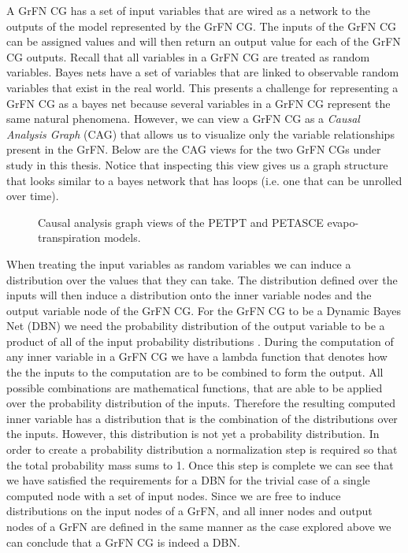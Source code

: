 A GrFN CG has a set of input variables that are wired as a network to the outputs of the model represented by the GrFN CG.
The inputs of the GrFN CG can be assigned values and will then return an output value for each of the GrFN CG outputs.
Recall that all variables in a GrFN CG are treated as random variables.
Bayes nets have a set of variables that are linked to observable random variables that exist in the real world.
This presents a challenge for representing a GrFN CG as a bayes net because several variables in a GrFN CG represent the same natural phenomena.
However, we can view a GrFN CG as a \emph{Causal Analysis Graph} (CAG) that allows us to visualize only the variable relationships present in the GrFN.
Below are the CAG views for the two GrFN CGs under study in this thesis. Notice that inspecting this view gives us a graph structure that looks similar to a bayes network that has loops (i.e. one that can be unrolled over time).

\FloatBarrier
\begin{figure}[!tbp]
  \centering

  \caption[GrFN Causal Analysis Graph Examples]{Causal analysis graph views of the PETPT and PETASCE evapo-transpiration models.}
\end{figure}
\FloatBarrier

When treating the input variables as random variables we can induce a distribution over the values that they can take.
The distribution defined over the inputs will then induce a distribution onto the inner variable nodes and the output variable node of the GrFN CG.
For the GrFN CG to be a Dynamic Bayes Net (DBN) we need the probability distribution of the output variable to be a product of all of the input probability distributions \citep{pearl2009causality}.
During the computation of any inner variable in a GrFN CG we have a lambda function that denotes how the the inputs to the computation are to be combined to form the output.
All possible combinations are mathematical functions, that are able to be applied over the probability distribution of the inputs.
Therefore the resulting computed inner variable has a distribution that is the combination of the distributions over the inputs.
However, this distribution is not yet a probability distribution.
In order to create a probability distribution a normalization step is required so that the total probability mass sums to 1.
Once this step is complete we can see that we have satisfied the requirements for a DBN for the trivial case of a single computed node with a set of input nodes.
Since we are free to induce distributions on the input nodes of a GrFN, and all inner nodes and output nodes of a GrFN are defined in the same manner as the case explored above we can conclude that a GrFN CG is indeed a DBN.




